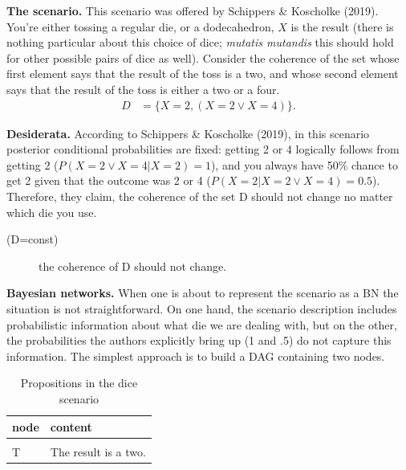 \documentclass[
  10pt,
]{scrartcl}
\newcommand{\s}[1]{\textsf{#1}}
\begin{document}
\textbf{The scenario.} This scenario was offered by Schippers \& Koscholke (2019). You're either tossing a regular die, or a dodecahedron, \(X\) is the result (there is nothing particular about this choice of dice; \emph{mutatis mutandis} this should hold for other possible pairs of dice as well). Consider the coherence of the set whose first element says that the result of the toss is a two, and whose second element says that the result of the toss is either a two or a four.
\begin{align*} D &= \{X=2, (X=2\vee X=4)\}.\end{align*}

\noindent \textbf{Desiderata.} According to Schippers \& Koscholke (2019), in this scenario posterior conditional probabilities are fixed: getting 2 or 4 logically follows from getting 2 (\(P(X=2\vee X=4|X=2)=1\)), and you always have 50\% chance to get 2 given that the outcome was 2 or 4 (\(P(X=2|X=2\vee X=4)=0.5\)). Therefore, they claim, the coherence of the set \s{D} should not change no matter which die you use.

\vspace{2mm}\begin{description}
    \item[(\s{D=const})] the coherence of \s{D} should not change.
\end{description}\vspace{2mm}

\textbf{Bayesian networks.} When one is about to represent the scenario as a BN the situation is not straightforward. On one hand, the scenario description includes probabilistic information about what die we are dealing with, but on the other, the probabilities the authors explicitly bring up (1 and .5) do not capture this information. The simplest approach is to build a DAG containing two nodes.

\begin{table}[H]

\caption{\label{tab:penguinsDesiderata}Propositions in the dice scenario}
\centering
\begin{tabular}[t]{ll}
\toprule
node & content\\
\midrule
\cellcolor{gray!6}{TF} & \cellcolor{gray!6}{The result is a two or a four.}\\
T & The result is a two.\\
\bottomrule
\end{tabular}
\end{table}
\end{document}
